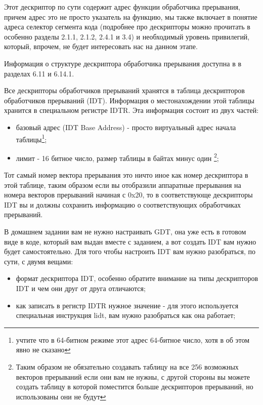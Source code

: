 Этот дескриптор по сути содержит адрес функции обработчика прерывания, причем
адрес это не просто указатель на функцию, мы также включает в понятие адреса
селектор сегмента кода (подробнее про дескрипторы можно прочитать в
\cite{INTEL:SYSV3} особенно разделы 2.1.1, 2.1.2, 2.4.1 и 3.4) и необходимый
уровень привилегий, который, впрочем, не будет интересовать нас на данном этапе.

Информация о структуре дескриптора обработчика прерывания доступна в
\cite{INTEL:SYSV3} в разделах 6.11 и 6.14.1.

Все дескрипторы обработчиков прерываний хранятся в таблица дескрипторов
обработчиков прерываний (IDT). Информация о местонахождении этой таблицы
хранится в специальном регистре IDTR. Эта информация состоит из двух частей:
\begin{itemize}
  \item базовый адрес (IDT Base Address) - просто виртуальный адрес начала
        таблицы\footnote{учтите что в 64-битном режиме этот адрес 64-битное
        число, хотя в \cite{INTEL:SYSV3} об этом явно не сказано};
  \item лимит - 16 битное число, размер таблицы в байтах минус один
        \footnote{Таким образом не обязательно создавать таблицу на все 256
        возможных векторов прерываний если они вам не нужны, с другой стороны
        вы можете создать таблицу в которой поместится больше дескрипторов
        прерываний, но использованы они не будут};
\end{itemize}

Тот самый номер вектора прерывания это ничто иное как номер дескриптора в этой
таблице, таким образом если вы отобразили аппаратные прерывания на номера
векторов прерываний начиная с 0x20, то в соответствующе дескрипторы IDT вы и
должны сохранить информацию о соответствующих обработчиках прерываний.

В домашнем задании вам не нужно настраивать GDT, она уже есть в готовом виде в
коде, который вам выдан вместе с заданием, а вот создать IDT вам нужно будет
самостоятельно. Для того чтобы настроить IDT вам нужно разобраться, по сути,
с двумя вещами:
\begin{itemize}
  \item формат дескриптора IDT, особенно обратите внимание на типы дескрипторов
        IDT и чем они друг от друга отличаются;
  \item как записать в регистр IDTR нужное значение - для этого используется
        специальная инструкция lidt, вам нужно разобраться как она работает;
\end{itemize}

